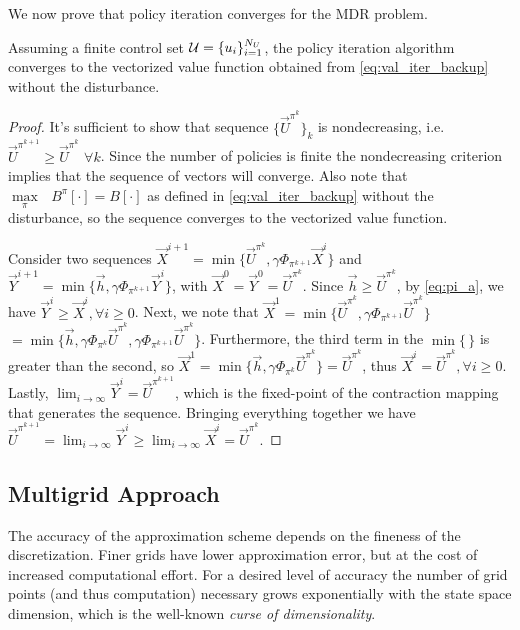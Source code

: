 We now prove that policy iteration converges for the MDR problem.
%
\begin{proposition}
Assuming a finite control set ${\mathcal{U}=\{u_i\}_{i=1}^{N_U}}$, the policy iteration algorithm converges to the vectorized value function obtained from \eqref{eq:val_iter_backup} without the disturbance.
\end{proposition}%
\noindent \begin{proof}
It's sufficient to show that sequence ${\{ \vec{U}^{\pi^{k}}\}}_k$ is nondecreasing, i.e. $\vec{U}^{\pi^{k+1}} \geq \vec{U}^{\pi^k}$ $\forall k$. Since the number of policies is finite the nondecreasing criterion implies that the sequence of vectors will converge. Also note that $\underset{\pi}{\max}\text{ }B^{\pi}[\cdot] = B[\cdot]$ as defined in \eqref{eq:val_iter_backup} without the disturbance, so the sequence converges to the vectorized value function.

Consider two sequences ${\vec{X}^{i+1}=\min\big\{\vec{U}^{\pi^k}, \gamma \Phi_{\pi^{k+1}}\vec{X}^i \big\}}$ and ${\vec{Y}^{i+1}=\min\big\{\vec{h}, \gamma \Phi_{\pi^{k+1}} \vec{Y}^i \big\}}$, with ${\vec{X}^0=\vec{Y}^0=\vec{U}^{\pi^k}}$.
Since ${\vec{h}\geq \vec{U}^{\pi^k}}$, by \eqref{eq:pi_a}, we have ${\vec{Y}^i \geq \vec{X}^i,\forall i \geq 0}$.
Next, we note that ${\vec{X}^{1}=\min\big\{\vec{U}^{\pi^k},\gamma \Phi_{\pi^{k+1}}\vec{U}^{\pi^k}\big\}}$ ${=\min\big\{\vec{h}, \gamma \Phi_{\pi^{k}}\vec{U}^{\pi^k},\gamma \Phi_{\pi^{k+1}}\vec{U}^{\pi^k}\big\}}$.
Furthermore, the third term in the $\min\{\,\}$ is greater than the second, so $\vec{X}^{1}=\min\big\{\vec{h}, \gamma \Phi_{\pi^{k}}\vec{U}^{\pi^k} \big\} =  \vec{U}^{\pi^k}$, thus ${\vec{X}^{i} =  \vec{U}^{\pi^k},\forall i \geq 0}$.
Lastly, $\lim_{i\rightarrow \infty}\vec{Y}^i= \vec{U}^{\pi^{k+1}}$, which is the fixed-point of the contraction mapping that generates the sequence.
Bringing everything together we have $\vec{U}^{\pi^{k+1}} = \lim_{i\rightarrow \infty}\vec{Y}^i \geq   \lim_{i\rightarrow \infty}\vec{X}^i = \vec{U}^{\pi^{k}}.$
\end{proof}



\subsection{Multigrid Approach}

The accuracy of the approximation scheme depends on the fineness of the discretization. Finer grids have lower approximation error, but at the cost of increased computational effort. For a desired level of accuracy the number of grid points (and thus computation) necessary grows exponentially with the state space dimension, which is the well-known \emph{curse of dimensionality}. 

